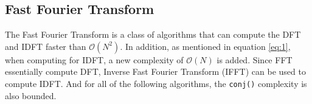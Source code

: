 \documentclass{article}
\begin{document}
\subsection{Fast Fourier Transform}
The Fast Fourier Transform is a class of algorithms that can compute the DFT and IDFT faster than $\mathcal{O}(N^2)$. In addition, as mentioned in equation \ref{eq:1}, when computing for IDFT, a new complexity of $\mathcal{O}(N)$ is added. Since FFT essentially compute DFT, Inverse Fast Fourier Transform (IFFT) can be used to compute IDFT. And for all of the following algorithms, the \texttt{conj()} complexity is also bounded.
%
\end{document}
